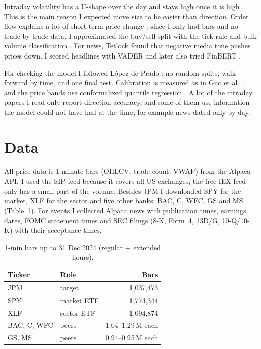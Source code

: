 \documentclass[11pt,a4paper]{article}
\begin{document}
Intraday volatility has a U-shape over the day and stays high once it is high \cite{andersen1997,bollerslev1986}.
This is the main reason I expected move size to be easier than direction. Order flow explains a lot of short-term
price change \cite{cont2014}; since I only had bars and no trade-by-trade data, I approximated the buy/sell split with
the tick rule \cite{lee1991} and bulk volume classification \cite{easley2012}. For news, Tetlock \cite{tetlock2007}
found that negative media tone pushes prices down. I scored headlines with VADER \cite{hutto2014} and later also
tried FinBERT \cite{araci2019}.

For checking the model I followed L\'opez de Prado \cite{lopezdeprado2018}: no random splits, walk-forward by time,
and one final test. Calibration is measured as in Guo et al.\ \cite{guo2017}, and the price bands use conformalized
quantile regression \cite{romano2019}. A lot of the intraday papers I read only report direction accuracy, and some
of them use information the model could not have had at the time, for example news dated only by day.

\section{Data}
All price data is 1-minute bars (OHLCV, trade count, VWAP) from the Alpaca API. I used the SIP feed because it covers
all US exchanges; the free IEX feed only has a small part of the volume. Besides JPM I downloaded SPY for the market,
XLF for the sector and five other banks: BAC, C, WFC, GS and MS (Table~\ref{tab:data}). For events I collected Alpaca
news with publication times, earnings dates, FOMC statement times and SEC filings (8-K, Form~4, 13D/G, 10-Q/10-K)
with their acceptance times.

\begin{table}[t]
\centering\small
\caption{1-min bars up to 31 Dec 2024 (regular + extended hours).}
\label{tab:data}
\begin{tabular}{@{}l l r@{}}
\toprule
Ticker & Role & Bars \\
\midrule
JPM & target & 1,037,473 \\
SPY & market ETF & 1,774,344 \\
XLF & sector ETF & 1,094,874 \\
BAC, C, WFC & peers & 1.04--1.29\,M each \\
GS, MS & peers & 0.94--0.95\,M each \\
\bottomrule
\end{tabular}
\end{table}
\end{document}
